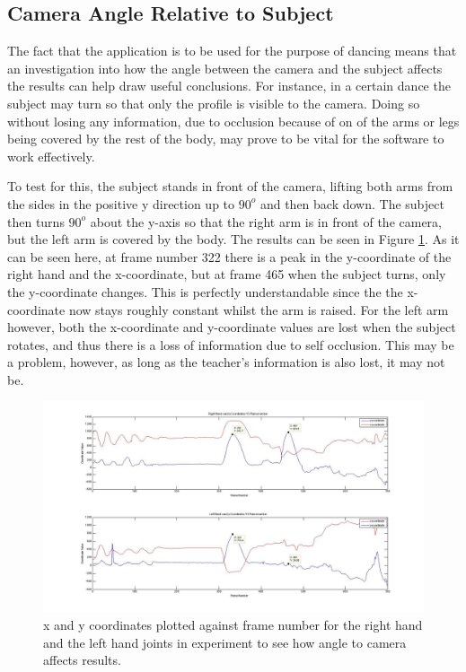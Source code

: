 \documentclass[10pt,a4paper]{article}
\begin{document}
\subsection{Camera Angle Relative to Subject}
\noindent 
The fact that the application is to be used for the purpose of dancing means that an investigation into how the angle between the camera and the subject affects the results can help draw useful conclusions. For instance, in a certain dance the subject may turn so that only the profile is visible to the camera. Doing so without losing any information, due to occlusion because of on of the arms or legs being covered by the rest of the body, may prove to be vital for the software to work effectively. 
 
\noindent
To test for this, the subject stands in front of the camera, lifting both arms from the sides in the positive y direction up to $90^o$ and then back down. The subject then turns $90^o$ about the y-axis so that the right arm is in front of the camera, but the left arm is covered by the body. The results can be seen in Figure \ref{angle_camera}. As it can be seen here, at frame number 322 there is a peak in the y-coordinate of the right hand and the x-coordinate, but at frame 465 when the subject turns, only the y-coordinate changes. This is perfectly understandable since the the x-coordinate now stays roughly constant whilst the arm is raised. For the left arm however, both the x-coordinate and y-coordinate values are lost when the subject rotates, and thus there is a loss of information due to self occlusion. This may be a problem, however, as long as the teacher's information is also lost, it may not be.  
\begin{figure}[H]
\centering
\includegraphics[scale=0.2]{Angle_To_Camera.jpg}
\caption{x and y coordinates plotted against frame number for the right hand and the left hand joints in experiment to see how angle to camera affects results.}
\label{angle_camera}
\end{figure}
\end{document}
